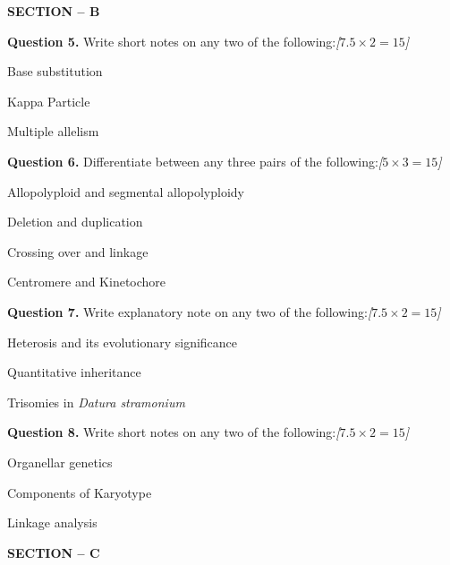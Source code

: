 \documentclass[11pt,a4paper]{article}
\newcommand{\pts}[1]{\hfill   \textit{[#1]}}
\begin{document}
\begin{center}
   \textbf{SECTION -- B}
\end{center}

\medskip


\noindent   \textbf{Question 5.} Write short notes on any two of the following:\pts{$7.5  \times 2 = 15$}

\begin{parts}
  \item Base substitution
  \item Kappa Particle
  \item Multiple allelism
\end{parts}

\medskip


\noindent   \textbf{Question 6.} Differentiate between any three pairs of the following:\pts{$5  \times 3 = 15$}

\begin{parts}
  \item Allopolyploid and segmental allopolyploidy
  \item Deletion and duplication
  \item Crossing over and linkage
  \item Centromere and Kinetochore
\end{parts}

\medskip


\noindent   \textbf{Question 7.} Write explanatory note on any two of the following:\pts{$7.5  \times 2 = 15$}

\begin{parts}
  \item Heterosis and its evolutionary significance
  \item Quantitative inheritance
  \item Trisomies in   \textit{Datura stramonium}
\end{parts}

\medskip


\noindent   \textbf{Question 8.} Write short notes on any two of the following:\pts{$7.5  \times 2 = 15$}

\begin{parts}
  \item Organellar genetics
  \item Components of Karyotype
  \item Linkage analysis
\end{parts}

\bigskip

\begin{center}
   \textbf{SECTION -- C}
\end{center}
\end{document}
